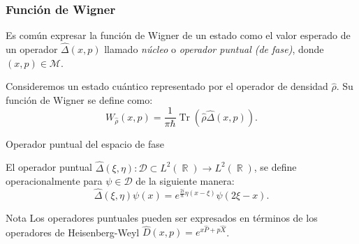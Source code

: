\documentclass[10pt,spanish]{beamer}
\DeclareMathOperator{\R}{\mathbb{R}}
\DeclareMathOperator{\Tr}{Tr}
\begin{document}
  \begin{frame}
    \frametitle{Función de Wigner}

    Es común expresar la función de Wigner de un estado como
    el valor esperado de un operador $\hat\Delta(x,p)$
    llamado \textit{núcleo} o \textit{operador puntual (de
    fase)}, donde $(x,p) \in \mathcal M$.
    
    \vspace{5mm}

    \pause

    \begin{definition}
      Consideremos un estado cuántico representado por el
      operador de densidad $\hat \rho$. Su función de Wigner
      se define como:
      \begin{equation}
        W_{\hat\rho}(x,p)
        = \frac{1}{\pi \hbar} \Tr\left(
          \hat \rho \hat \Delta(x,p)
        \right).
      \end{equation}
    \end{definition}
  \end{frame}

  \begin{frame}{Operador puntual del espacio de fase}
    \begin{definition}
      El operador puntual $\hat \Delta(\xi,\eta) : \mathcal
      D \subset L^2(\R) \to L^2(\R)$, se define
      operacionalmente para $\psi \in \mathcal D$ de la
      siguiente manera:
      \begin{equation}
        \hat \Delta(\xi,\eta) \psi(x)
        = e^{\frac{2i}{\hbar} \eta(x - \xi)} \psi(2\xi - x).
      \end{equation}
    \end{definition}

    \vspace{5mm}

    \pause

    \begin{block}{Nota}
      Los operadores puntuales pueden ser expresados en
      términos de los operadores de Heisenberg-Weyl $\hat
      D(x,p) = e^{x \hat P + p \hat X}$.
    \end{block}
    
  \end{frame}


\end{document}
